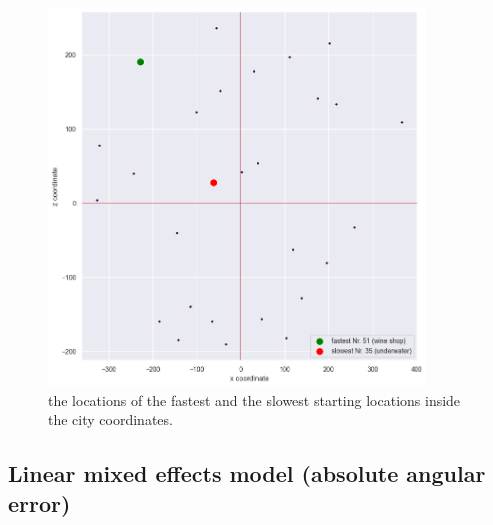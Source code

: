 \begin{figure}[h]
	\centering
	\includegraphics[width=100mm]{figures/fastest_slowest_starting_locations_RT.png}
	\caption[Locations of fastest and slowest starting locations in city]{the locations of the fastest and the slowest starting locations inside the city coordinates.}
	\label{fig:fastest_slowest_locs}
\end{figure}

\subsection{Linear mixed effects model (absolute angular error)}


